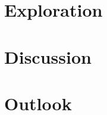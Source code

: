 \documentclass[12pt]{book} %
\begin{document}


\chapter{Exploration}



\chapter{Discussion}



\chapter{Outlook}





\clearpage{}   %
{} %




\begin{appendices}
%



\end{appendices}


\end{document}
